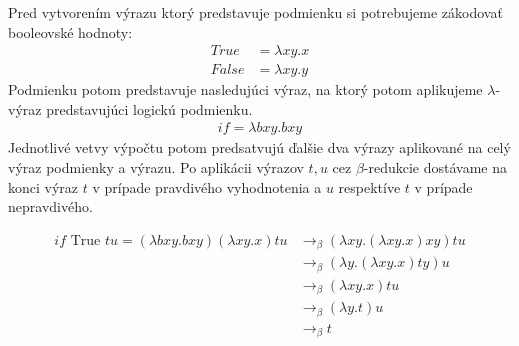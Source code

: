 \documentclass[a4paper,10pt,oneside]{report}%
\begin{document}
    Pred vytvorením výrazu ktorý predstavuje podmienku si potrebujeme zákodovať
booleovské hodnoty:
    \begin{align*}
        True &= \lambda x y . x \\
        False &= \lambda x y . y
    \end{align*}
    Podmienku potom predstavuje nasledujúci výraz, na ktorý potom aplikujeme $\lambda$-výraz
predstavujúci logickú podmienku.
\begin{align*}
    if = \lambda b x y . b x y
\end{align*}
    Jednotlivé vetvy výpočtu potom predsatvujú ďalšie dva výrazy aplikované na celý
výraz podmienky a výrazu.
    Po aplikácii výrazov $t,u$ cez $\beta$-redukcie dostávame na konci výraz $t$
v prípade pravdivého vyhodnotenia a $u$ respektíve $t$ v prípade nepravdivého.

\begin{align*}
    if \textrm{ True } t u = (\lambda bxy.bxy)(\lambda xy.x) t u & \to_{\beta} (\lambda xy.(\lambda xy.x)xy)tu \\
                                                     & \to_{\beta} (\lambda y.( \lambda xy.x)ty)u \\
                                                     & \to_{\beta} (\lambda xy.x)tu \\
                                                     & \to_{\beta} (\lambda y.t)u \\
                                                     & \to_{\beta} t
\end{align*}
\end{document}
